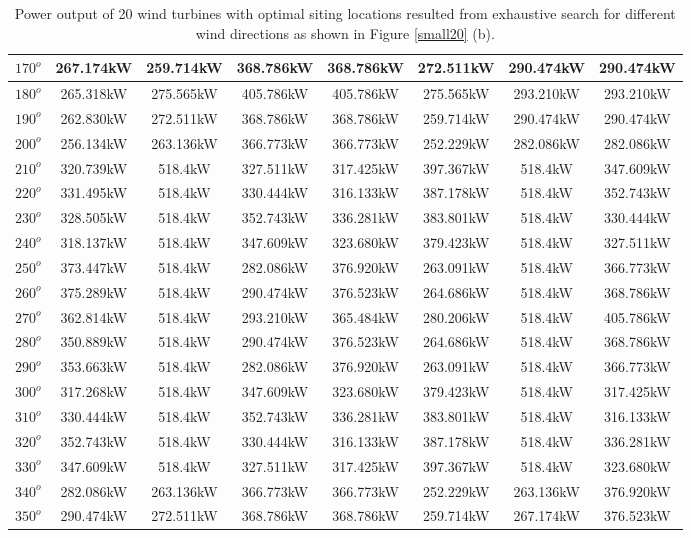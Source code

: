 \begin{table}[H]
\begin{tabular}{|c|c|c|c|c|c|c|c|}
		$170^o$	& 267.174kW	& 259.714kW	& 368.786kW	& 368.786kW	& 272.511kW	& 290.474kW	& 290.474kW	\\ \hline
		$180^o$	& 265.318kW	& 275.565kW	& 405.786kW	& 405.786kW	& 275.565kW	& 293.210kW	& 293.210kW	\\ \hline
		$190^o$	& 262.830kW	& 272.511kW	& 368.786kW	& 368.786kW	& 259.714kW	& 290.474kW	& 290.474kW	\\ \hline
		$200^o$	& 256.134kW	& 263.136kW	& 366.773kW	& 366.773kW	& 252.229kW	& 282.086kW	& 282.086kW	\\ \hline
		$210^o$	& 320.739kW	& 518.4kW	& 327.511kW	& 317.425kW	& 397.367kW	& 518.4kW	& 347.609kW	\\ \hline
		$220^o$	& 331.495kW	& 518.4kW	& 330.444kW	& 316.133kW	& 387.178kW	& 518.4kW	& 352.743kW	\\ \hline
		$230^o$	& 328.505kW	& 518.4kW	& 352.743kW	& 336.281kW	& 383.801kW	& 518.4kW	& 330.444kW	\\ \hline
		$240^o$	& 318.137kW	& 518.4kW	& 347.609kW	& 323.680kW	& 379.423kW	& 518.4kW	& 327.511kW	\\ \hline
		$250^o$	& 373.447kW	& 518.4kW	& 282.086kW	& 376.920kW	& 263.091kW	& 518.4kW	& 366.773kW	\\ \hline
		$260^o$	& 375.289kW	& 518.4kW	& 290.474kW	& 376.523kW	& 264.686kW	& 518.4kW	& 368.786kW	\\ \hline
		$270^o$	& 362.814kW	& 518.4kW	& 293.210kW	& 365.484kW	& 280.206kW	& 518.4kW	& 405.786kW	\\ \hline
		$280^o$	& 350.889kW	& 518.4kW	& 290.474kW	& 376.523kW	& 264.686kW	& 518.4kW	& 368.786kW	\\ \hline
		$290^o$	& 353.663kW	& 518.4kW	& 282.086kW	& 376.920kW	& 263.091kW	& 518.4kW	& 366.773kW	\\ \hline
		$300^o$	& 317.268kW	& 518.4kW	& 347.609kW	& 323.680kW	& 379.423kW	& 518.4kW	& 317.425kW	\\ \hline
		$310^o$	& 330.444kW	& 518.4kW	& 352.743kW	& 336.281kW	& 383.801kW	& 518.4kW	& 316.133kW	\\ \hline
		$320^o$	& 352.743kW	& 518.4kW	& 330.444kW	& 316.133kW	& 387.178kW	& 518.4kW	& 336.281kW	\\ \hline
		$330^o$	& 347.609kW	& 518.4kW	& 327.511kW	& 317.425kW	& 397.367kW	& 518.4kW	& 323.680kW	\\ \hline
		$340^o$	& 282.086kW	& 263.136kW	& 366.773kW	& 366.773kW	& 252.229kW	& 263.136kW	& 376.920kW	\\ \hline
		$350^o$	& 290.474kW	& 272.511kW	& 368.786kW	& 368.786kW	& 259.714kW	& 267.174kW	& 376.523kW	\\ \hline
        	\end{tabular}
        	\caption{Power output of 20 wind turbines with optimal siting locations resulted from exhaustive search for different wind directions as shown in Figure \ref{small20} (b).}
        	\label{table20b}
        \end{table}
